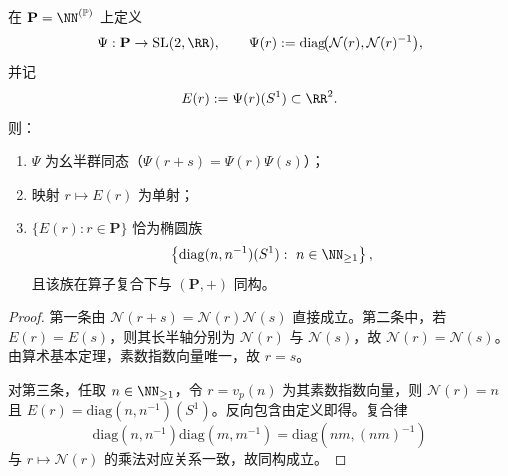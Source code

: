 \begin{proposition}\label{prop:conclusion-prime-register-ellipse-complete-equivalence}
在 \(\mathbf P=\NN^{(\mathbb P)}\) 上定义
\[
\Psi:\mathbf P\to \mathrm{SL}(2,\RR),\qquad
\Psi(r):=\mathrm{diag}\!\bigl(\mathcal N(r),\mathcal N(r)^{-1}\bigr),
\]
并记
\[
E(r):=\Psi(r)(S^1)\subset\RR^2.
\]
则：
\begin{enumerate}
  \item \(\Psi\) 为幺半群同态（\(\Psi(r+s)=\Psi(r)\Psi(s)\)）；
  \item 映射 \(r\mapsto E(r)\) 为单射；
  \item \(\{E(r):r\in\mathbf P\}\) 恰为椭圆族
  \[
  \left\{
  \mathrm{diag}(n,n^{-1})(S^1):\ n\in\NN_{\ge 1}
  \right\},
  \]
  且该族在算子复合下与 \((\mathbf P,+)\) 同构。
\end{enumerate}
\end{proposition}
\begin{proof}
第一条由
\(
\mathcal N(r+s)=\mathcal N(r)\mathcal N(s)
\)
直接成立。第二条中，若 \(E(r)=E(s)\)，则其长半轴分别为 \(\mathcal N(r)\) 与 \(\mathcal N(s)\)，故 \(\mathcal N(r)=\mathcal N(s)\)。由算术基本定理，素数指数向量唯一，故 \(r=s\)。

对第三条，任取 \(n\in\NN_{\ge1}\)，令 \(r=v_p(n)\) 为其素数指数向量，则 \(\mathcal N(r)=n\) 且 \(E(r)=\mathrm{diag}(n,n^{-1})(S^1)\)。反向包含由定义即得。复合律
\[
\mathrm{diag}(n,n^{-1})\mathrm{diag}(m,m^{-1})
=
\mathrm{diag}(nm,(nm)^{-1})
\]
与 \(r\mapsto \mathcal N(r)\) 的乘法对应关系一致，故同构成立。
\end{proof}

